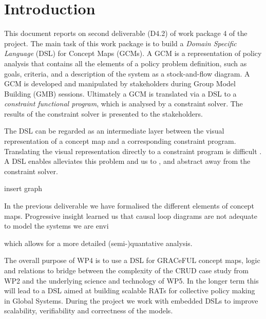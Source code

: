 \section{Introduction}\label{introduction}

This document reports on second deliverable (D4.2) of work package 4 of the
\grace project. The main task of this work package is to build a \emph{Domain
Specific Language} (DSL) for \grace Concept Maps (GCMs). A GCM is a
representation of policy analysis that contains all the elements of a policy
problem definition, such as goals, criteria, and a description of the system as
a stock-and-flow diagram. A GCM is developed and manipulated by stakeholders
during Group Model Building (GMB) sessions. Ultimately a GCM is translated via a
DSL to a \emph{constraint functional program}, which is analysed by a constraint
solver. The results of the constraint solver is presented to the stakeholders.


The DSL can be regarded as an intermediate layer between the visual representation
of a \grace concept map and a corresponding constraint program. Translating the
visual representation directly to a constraint program is difficult .
A DSL enables alleviates this problem and 
us to , and abstract away from the constraint solver.





insert graph


In the previous deliverable we have formalised the different elements of \grace
concept maps. Progressive insight learned us that causal loop diagrams are not
adequate to model the systems we are envi 

which allows for a more detailed (semi-)quantative analysis.







The overall purpose of WP4 is to use a DSL for GRACeFUL concept maps,
logic and relations to bridge between the complexity of the CRUD case
study from WP2 and the underlying science and technology of WP5.  In
the longer term this will lead to a DSL aimed at building scalable
RATs for collective policy making in Global Systems.  During the
project we work with embedded DSLs to improve scalability,
verifiability and correctness of the models.

